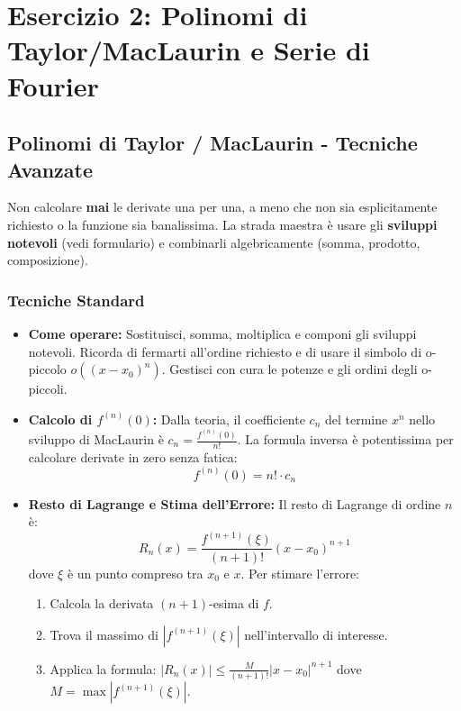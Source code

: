 \section{Esercizio 2: Polinomi di Taylor/MacLaurin e Serie di Fourier}

\subsection{Polinomi di Taylor / MacLaurin - Tecniche Avanzate}
\begin{strategia}
Non calcolare \textbf{mai} le derivate una per una, a meno che non sia esplicitamente richiesto o la funzione sia banalissima. La strada maestra è usare gli \textbf{sviluppi notevoli} (vedi formulario) e combinarli algebricamente (somma, prodotto, composizione).
\end{strategia}

\subsubsection{Tecniche Standard}
\begin{itemize}
    \item \textbf{Come operare:} Sostituisci, somma, moltiplica e componi gli sviluppi notevoli. Ricorda di fermarti all'ordine richiesto e di usare il simbolo di o-piccolo $o((x-x_0)^n)$. Gestisci con cura le potenze e gli ordini degli o-piccoli.
    \item \textbf{Calcolo di $f^{(n)}(0)$:} Dalla teoria, il coefficiente $c_n$ del termine $x^n$ nello sviluppo di MacLaurin è $c_n = \frac{f^{(n)}(0)}{n!}$. La formula inversa è potentissima per calcolare derivate in zero senza fatica: 
    \[ f^{(n)}(0) = n! \cdot c_n \]
    \item \textbf{Resto di Lagrange e Stima dell'Errore:} Il resto di Lagrange di ordine $n$ è:
    \[ R_n(x) = \frac{f^{(n+1)}(\xi)}{(n+1)!}(x-x_0)^{n+1} \]
    dove $\xi$ è un punto compreso tra $x_0$ e $x$. Per stimare l'errore:
    \begin{enumerate}
        \item Calcola la derivata $(n+1)$-esima di $f$.
        \item Trova il massimo di $|f^{(n+1)}(\xi)|$ nell'intervallo di interesse.
        \item Applica la formula: $|R_n(x)| \le \frac{M}{(n+1)!}|x-x_0|^{n+1}$ dove $M = \max |f^{(n+1)}(\xi)|$.
    \end{enumerate}
\end{itemize}


